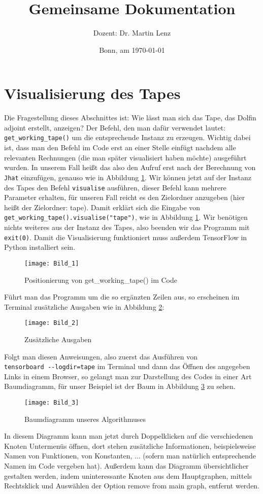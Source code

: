 \documentclass[a4paper, 12pt]{scrartcl}
\title{Gemeinsame Dokumentation 
	\vspace{1cm}
	\mygraphics{0.7\textwidth}{graphics/shop1}{}
}
\author{Dozent: Dr. Martin Lenz}
\date{Bonn, am \today{}}
\begin{document}
	\section{Visualisierung des Tapes}
	Die Fragestellung dieses Abschnittes ist: Wie lässt man sich das Tape, das Dolfin adjoint erstellt, anzeigen?
	Der Befehl, den man dafür verwendet lautet: \verb|get_working_tape()| um die entsprechende Instanz zu erzeugen. %
	Wichtig dabei ist, dass man den Befehl im Code erst an einer Stelle einfügt nachdem alle relevanten Rechnungen (die man später visualisiert haben möchte) ausgeführt wurden. In unserem Fall heißt das also den Aufruf erst nach der Berechnung von \verb|Jhat| einzufügen, genauso wie in Abbildung \ref{Abb_1}. Wir können jetzt auf der Instanz des Tapes den Befehl \verb|visualise| ausführen, dieser Befehl kann mehrere Parameter erhalten, für unseren Fall reicht es den Zielordner anzugeben (hier heißt der Zielordner: tape). Damit erklärt sich die Eingabe von \\ \verb|get_working_tape().visualise("tape")|,
	wie in Abbildung \ref{Abb_1}. Wir benötigen nichts weiteres aus der Instanz des Tapes, also beenden wir das Programm mit \verb|exit(0)|. Damit die Visualisierung funktioniert muss außerdem TensorFlow in Python installiert sein.
	
	\begin{figure}[h]
		\centering
		\texttt{[image: Bild\_1]}
		\caption{Positionierung von get\_working\_tape() im Code}
		\label{Abb_1}
	\end{figure}
	Führt man das Programm um die so ergänzten Zeilen aus, so erscheinen im Terminal zusätzliche Ausgaben wie in Abbildung \ref{Abb_2}:
	
	\begin{figure}[h]
		\centering
		\texttt{[image: Bild\_2]}
		\caption{Zusätzliche Ausgaben}
		\label{Abb_2}
	\end{figure}
	Folgt man diesen Anweisungen, also zuerst das Ausführen von
	\\
	\verb|tensorboard --logdir=tape| im Terminal und dann das Öffnen des angegeben Links in einem Browser, so gelangt man zur Darstellung des Codes in einer Art Baumdiagramm, für unser Beispiel ist der Baum in Abbildung \ref{Abb_3} zu sehen.
	
	\begin{figure}[H]
		\centering
		\texttt{[image: Bild\_3]}
		\caption{Baumdiagramm unseres Algorithmuses}
		\label{Abb_3}
	\end{figure}
	In diesem Diagramm kann man jetzt durch Doppelklicken auf die verschiedenen Knoten \glqq Untermenüs\grqq{} öffnen, dort stehen zusätzliche Informationen, beispielsweise Namen von Funktionen, von Konstanten, ... (sofern man natürlich entsprechende Namen im Code vergeben hat). Außerdem kann das Diagramm übersichtlicher gestalten werden, indem uninteressante Knoten aus dem Hauptgraphen, mittels Rechtsklick und Auswählen der Option \glqq remove from main graph\grqq{}, entfernt werden.
	
\end{document}
